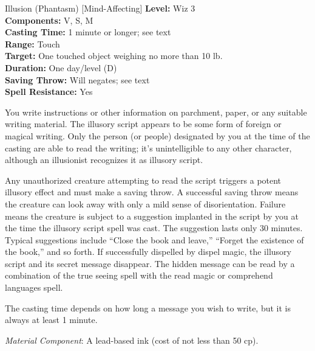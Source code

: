 {Illusion (Phantasm) [Mind-Affecting]}
{
	\textbf{Level:}
	Wiz 3\\
	\textbf{Components:}
	V, S, M\\
	\textbf{Casting Time:}
	1 minute or longer; see text\\
	\textbf{Range:}
	Touch\\
	\textbf{Target:}
	One touched object weighing no more than 10 lb.\\
	\textbf{Duration:}
	One day/level (D)\\
	\textbf{Saving Throw:}
	Will negates; see text\\
	\textbf{Spell Resistance:}
	Yes\\
}
{
	You write instructions or other information on parchment, paper, or any suitable writing material. The illusory script appears to be some form of foreign or magical writing. Only the person (or people) designated by you at the time of the casting are able to read the writing; it's unintelligible to any other character, although an illusionist recognizes it as illusory script.

	Any unauthorized creature attempting to read the script triggers a potent illusory effect and must make a saving throw. A successful saving throw means the creature can look away with only a mild sense of disorientation. Failure means the creature is subject to a suggestion implanted in the script by you at the time the illusory script spell was cast. The suggestion lasts only 30 minutes. Typical suggestions include ``Close the book and leave,'' ``Forget the existence of the book,'' and so forth. If successfully dispelled by dispel magic, the illusory script and its secret message disappear. The hidden message can be read by a combination of the true seeing spell with the read magic or comprehend languages spell.

	The casting time depends on how long a message you wish to write, but it is always at least 1 minute.

	\textit{Material Component}:
	A lead-based ink (cost of not less than 50 cp).

}
